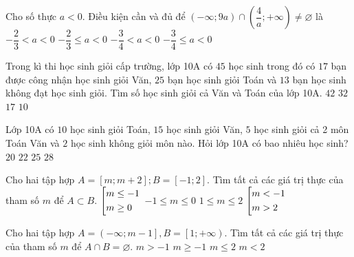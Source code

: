 \begin{ex}%
	Cho số thực $a<0$. Điều kiện cần và đủ để $(-\infty ; 9a) \cap \left( {\dfrac{4}{a};+\infty}\right)  \neq  \varnothing$ là
	\choice
	{\True $-\dfrac{2}{3}<a<0$}
	{$-\dfrac{2}{3}\leq a<0$}
	{$-\dfrac{3}{4}<a<0$}
	{$-\dfrac{3}{4}\leq a<0$}
\end{ex}

\begin{ex}%
	Trong kì thi học sinh giỏi cấp trường, lớp 10A có $45$ học sinh trong đó có  $17$ bạn được công nhận học sinh giỏi Văn, $25$ bạn học sinh giỏi Toán và $13$ bạn học sinh không đạt học sinh giỏi. Tìm số học sinh giỏi cả Văn và Toán của lớp 10A.
	\choice
	{$42$ }
	{$32$}
	{$17$}
	{\True $10$}
\end{ex}
\begin{ex}%
	Lớp 10A có $10$ học sinh giỏi Toán, $15$ học sinh giỏi Văn, $5$ học sinh giỏi cả 2 môn Toán Văn và $2$ học sinh không giỏi môn nào. Hỏi lớp 10A có bao nhiêu học sinh?
	\choice
	{$20$ }
	{\True $22$}
	{$25$}
	{$28$}
\end{ex}
\begin{ex}%
	Cho hai tập hợp $A = \left[ m; m + 2\right]; B =\left[ -1; 2\right]$. Tìm tất cả các giá trị thực của tham số $m$ để $A \subset B$.
	\choice
	{$\left[\begin{aligned}& m \leq -1 \\ & m \geq 0\end{aligned}\right.$}
	{\True $-1 \leq m \leq 0$}
	{$1 \leq m \leq 2$}
	{$\left[\begin{aligned}& m < -1\\& m > 2\end{aligned}\right.$}
\end{ex}

\begin{ex}%
	Cho hai tập hợp $A =\left( -\infty; m -1\right], B =\left[ 1; +\infty \right)$. Tìm tất cả các giá trị thực của tham số $m$ để $A \cap B = \varnothing$.
	\choice
	{$m > -1 $}
	{$m \geq -1$}
	{$m \leq 2$}
	{\True $m < 2$}
\end{ex}

